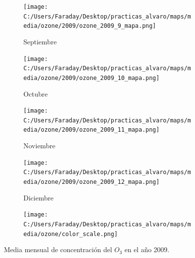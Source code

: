 \documentclass[12pt]{beamer}
\begin{document}
\begin{frame}[squeeze]
\begin{figure}[H]
\begin{subfigure}[H]{0.20\textwidth}
\texttt{[image: C:/Users/Faraday/Desktop/practicas\_alvaro/maps/media/ozone/2009/ozone\_2009\_9\_mapa.png]}
\captionsetup{labelformat=empty}
\caption{\scriptsize Septiembre}
\label{fig:map-ozone-2009-9}
\end{subfigure}
%
\begin{subfigure}[H]{0.20\textwidth}
\texttt{[image: C:/Users/Faraday/Desktop/practicas\_alvaro/maps/media/ozone/2009/ozone\_2009\_10\_mapa.png]}
\captionsetup{labelformat=empty}
\caption{\scriptsize Octubre}
\label{fig:map-ozone-2009-10}
\end{subfigure}
%
\begin{subfigure}[H]{0.20\textwidth}
\texttt{[image: C:/Users/Faraday/Desktop/practicas\_alvaro/maps/media/ozone/2009/ozone\_2009\_11\_mapa.png]}
\captionsetup{labelformat=empty}
\caption{\scriptsize Noviembre}
\label{fig:map-ozone-2009-11}
\end{subfigure}
%
\begin{subfigure}[H]{0.20\textwidth}
\texttt{[image: C:/Users/Faraday/Desktop/practicas\_alvaro/maps/media/ozone/2009/ozone\_2009\_12\_mapa.png]}
\captionsetup{labelformat=empty}
\caption{\scriptsize Diciembre}
\label{fig:map-ozone-2009-12}
\end{subfigure}

\begin{subfigure}[H]{0.45\textwidth}
\texttt{[image: C:/Users/Faraday/Desktop/practicas\_alvaro/maps/media/ozone/color\_scale.png]}
\captionsetup{labelformat=empty}
\caption{}
\end{subfigure}

\vspace*{-7mm}
\caption{\scriptsize Media mensual de concentración del $O_{3}$ en el año 2009.}
\label{fig:map-ozone-2009}
\end{figure}
\end{frame}
\end{document}
